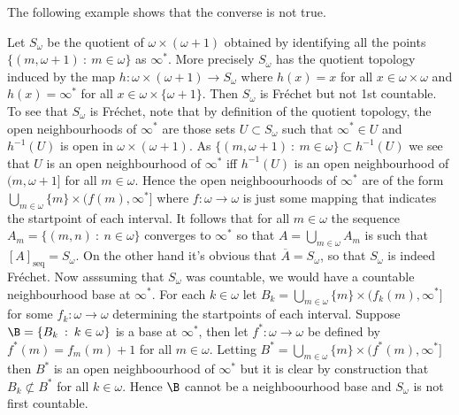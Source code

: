 \documentclass{article}
\newcommand{\seqcl}[1]{{[#1]_{\text{seq}}}}
\begin{document}
The following example shows that the converse is not true. 
\begin{exam}
    Let \(S_{\omega}\) be the quotient of \(\omega \times (\omega + 1)\) obtained by identifying all the points \(\{(m, \omega + 1) \: : \: m \in \omega\}\) as \(\infty^{\ast}\). More precisely \(S_{\omega}\) has the quotient topology induced by the map \(h: \omega \times (\omega + 1) \to S_{\omega}\) where \(h(x) = x\) for all \(x \in \omega \times \omega\) and \(h(x) = \infty^{\ast}\) for all \(x \in \omega \times \{\omega + 1\}\). Then \(S_{\omega}\) is Fréchet but not 1st countable. To see that \(S_{\omega}\) is Fréchet, note that by definition of the quotient topology, the open neighbourhoods of \(\infty^{\ast}\) are those sets \(U \subset S_{\omega}\) such that \(\infty^{\ast} \in U\) and \(h^{-1}(U)\) is open in \(\omega \times (\omega + 1)\). As \(\{(m, \omega + 1) \: : \:  m \in \omega\} \subset h^{-1}(U)\) we see that \(U\) is an open neighbourhood of \(\infty^{\ast}\) iff \(h^{-1}(U)\) is an open neighbourhood of \((m, \omega + 1]\) for all \(m \in \omega\).  %
    Hence the open neighboourhoods of \(\infty^{\ast}\) are of the form \(\bigcup_{m \in \omega}\{m\} \times (f(m), \infty^{\ast}]\) where \(f: \omega \to \omega\) is just some mapping that indicates the startpoint of each interval. It follows that for all \(m \in \omega\) the sequence \(A_m = \{(m, n) \: : \: n \in \omega\}\) converges to \(\infty^{\ast}\) so that \(A = \bigcup_{m \in \omega}A_m\) is such that \(\seqcl{A} = S_{\omega}\). On the other hand it's obvious that \(\overline{A} = S_{\omega}\), so that \(S_{\omega}\) is indeed Fréchet. Now asssuming that \(S_{\omega}\) was countable, we would have a countable neighbourhood base at \(\infty^{\ast}\). For each \(k \in \omega\) let \(B_k = \bigcup_{m \in \omega}\{m\} \times (f_k(m), \infty^{\ast}]\) for some \(f_k: \omega \to \omega\) determining the startpoints of each interval. Suppose \(\B = \{B_k \: : \: k \in \omega\}\) is a base at \(\infty^{\ast}\), then let \(f^{\ast}: \omega \to \omega\) be defined by \(f^{\ast}(m) = f_m(m) + 1\) for all \(m \in \omega\). Letting \(B^{\ast} = \bigcup_{m \in \omega}\{m\} \times (f^{\ast}(m), \infty^{\ast}]\) then \(B^{\ast}\) is an open neighboourhood of \(\infty^{\ast}\) but it is clear by construction that \(B_k \not\subset B^{\ast}\) for all \(k \in \omega\). Hence \(\B\) cannot be a neighboourhood base and   \(S_{\omega}\) is not first countable.
\end{exam}
\end{document}
